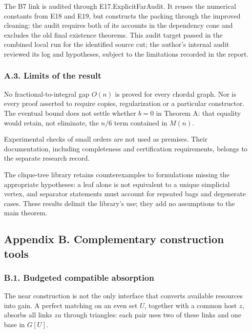 \documentclass[english,11pt,a4paper]{article}
\begin{document}
The B7 link is audited through {\ttfamily\small E17.\discretionary{\hbox{\ensuremath{\hookrightarrow}}}{}{}ExplicitFarA\discretionary{\hbox{\ensuremath{\hookrightarrow}}}{}{}udit}. It reuses the numerical constants from {\ttfamily\small E18} and {\ttfamily\small E19}, but constructs the packing through the improved cleaning: the audit requires both of its accounts in the dependency cone and excludes the old final existence theorems. This audit target passed in the combined local run for the identified source cut; the author's internal audit reviewed its log and hypotheses, subject to the limitations recorded in the report.

\subsubsection{A.3. Limits of the result}\label{a.3.-limits-of-the-result}

No fractional-to-integral gap \(O(n)\) is proved for every chordal graph. Nor is every proof asserted to require copies, regularization or a particular constructor. The eventual bound does not settle whether \(b=0\) in Theorem A: that equality would retain, not eliminate, the \(n/6\) term contained in \(M(n)\).

Experimental checks of small orders are not used as premises. Their documentation, including completeness and certification requirements, belongs to the separate research record.

The clique-tree library retains counterexamples to formulations missing the appropriate hypotheses: a leaf alone is not equivalent to a unique simplicial vertex, and separator statements must account for repeated bags and degenerate cases. These results delimit the library's use; they add no assumptions to the main theorem.

\subsection{Appendix B. Complementary construction tools}\label{appendix-b.-complementary-construction-tools}

\subsubsection{B.1. Budgeted compatible absorption}\label{b.1.-budgeted-compatible-absorption}

The near construction is not the only interface that converts available resources into gain. A perfect matching on an even set \(U\), together with a common host \(z\), absorbs all links \(zu\) through triangles: each pair uses two of these links and one base in \(G[U]\).
\end{document}
